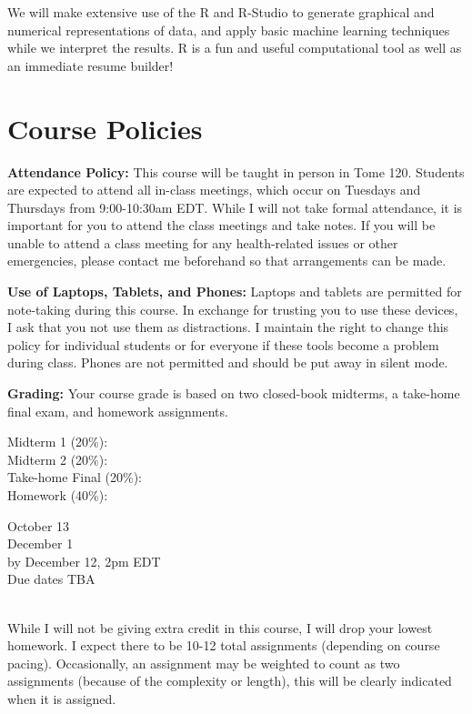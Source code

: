 \documentclass[11pt,letter]{article}
\begin{document}
We will make extensive use of the R and R-Studio to generate graphical and numerical representations of data, and apply basic machine learning techniques while we interpret the results. R is a fun and useful computational tool as well as an immediate resume builder!

\section*{Course Policies}
\textbf{Attendance Policy:} This course will be taught in person in Tome 120. Students are expected to attend all in-class meetings, which occur on Tuesdays and Thursdays from 9:00-10:30am EDT. While I will not take formal attendance, it is important for you to attend the class meetings and take notes. If you will be unable to attend a class meeting for any health-related issues or other emergencies, please contact me beforehand so that arrangements can be made.

\textbf{Use of Laptops, Tablets, and Phones:}  Laptops and tablets are permitted for note-taking during this course. In exchange for trusting you to use these devices, I ask that you not use them as distractions. I maintain the right to change this policy for individual students or for everyone if these tools become a problem during class. Phones are not permitted and should be put away in silent mode.

\textbf{Grading:} Your course grade is based on two closed-book midterms, a take-home final exam, and homework assignments.

\begin{minipage}{.65\textwidth}
Midterm 1 (20\%): \\
Midterm 2 (20\%): \\
Take-home Final (20\%): \\
Homework (40\%):
\end{minipage}%
\hspace*{-5cm}
\begin{minipage}{.5\textwidth}
October 13 \\
December 1 \\
by December 12, 2pm EDT \\
Due dates TBA


\end{minipage} \\

While I will not be giving extra credit in this course, I will drop your lowest homework. I expect there to be 10-12 total assignments (depending on course pacing). Occasionally, an assignment may be weighted to count as two assignments (because of the complexity or length), this will be clearly indicated when it is assigned.
\end{document}

